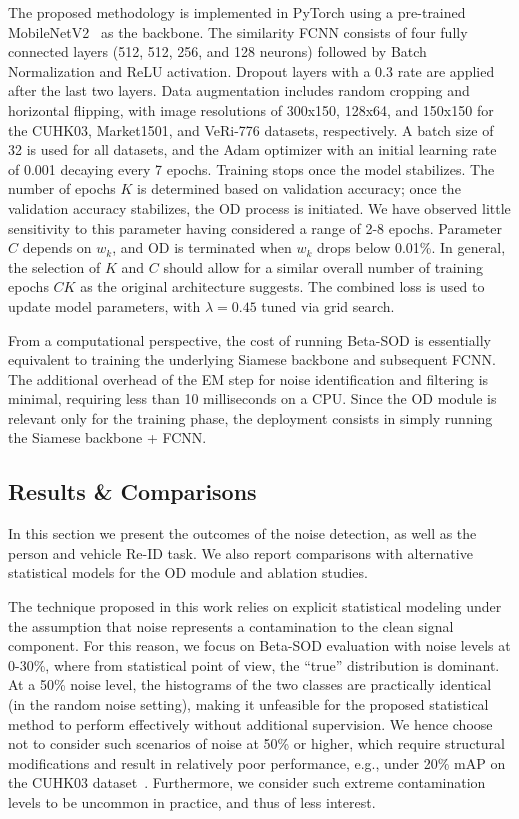 \documentclass[lettersize,journal]{IEEEtran}
\begin{document}
\vskip 0.15cm
The proposed methodology is implemented in PyTorch using a pre-trained MobileNetV2~\cite{sandler2018mobilenetv2} as the backbone. The similarity FCNN consists of four fully connected layers (512, 512, 256, and 128 neurons) followed by Batch Normalization and ReLU activation. Dropout layers with a 0.3 rate are applied after the last two layers. Data augmentation includes random cropping and horizontal flipping, with image resolutions of 300x150, 128x64, and 150x150 for the CUHK03, Market1501, and VeRi-776 datasets, respectively. A batch size of 32 is used for all datasets, and the Adam optimizer with an initial learning rate of 0.001 decaying every 7 epochs. Training stops once the model stabilizes. The number of epochs $K$ is determined based on validation accuracy; once the validation accuracy stabilizes, the OD process is initiated. We have observed little sensitivity to this parameter having considered a range of 2-8 epochs. Parameter $C$ depends on $w_k$, and OD is terminated when $w_k$ drops below 0.01\%. In general, the selection of $K$ and $C$ should allow for a similar overall number of training epochs $CK$ as the original architecture suggests. The combined loss is used to update model parameters, with $\lambda=0.45$ tuned via grid search.

From a computational perspective, the cost of running Beta-SOD is essentially equivalent to training the underlying Siamese backbone and subsequent FCNN. The additional overhead of the EM step for noise identification and filtering is minimal, requiring less than 10 milliseconds on a CPU. Since the OD module is relevant only for the training phase, the deployment consists in simply running the Siamese backbone + FCNN.

\subsection{Results \& Comparisons}
In this section we present the outcomes of the noise detection, as well as the person and vehicle Re-ID task. We also report comparisons with alternative statistical models for the OD module and ablation studies.

The technique proposed in this work relies on explicit statistical modeling under the assumption that noise represents a contamination to the clean signal component. For this reason, we focus on Beta-SOD evaluation with noise levels at 0-30\%, where from statistical point of view, the ``true'' distribution is dominant. At a 50\% noise level, the histograms of the two classes are practically identical (in the random noise setting), making it unfeasible for the proposed statistical method to perform effectively without additional supervision. We hence choose not to consider such scenarios of noise at 50\% or higher, which require structural modifications and result in relatively poor performance, e.g., under 20\% mAP on the CUHK03 dataset~\cite{23}. Furthermore, we consider such extreme contamination levels to be uncommon in practice, and thus of less interest.
\end{document}

